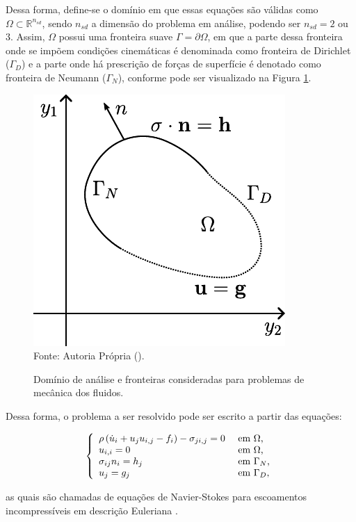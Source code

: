 \documentclass[_ArquivoPrincipal.tex]{subfiles}
\begin{document}
Dessa forma, define-se o domínio em que essas equações são válidas como $\Omega\subset\mathbb{R}^{n_{sd}}$, sendo $n_{sd}$ a dimensão do problema em análise, podendo ser $n_{sd}=2$ ou $3$. Assim, $\Omega$ possui uma fronteira suave $\Gamma=\partial\Omega$, em que a parte dessa fronteira onde se impõem condições cinemáticas é denominada como fronteira de Dirichlet ($\Gamma_D$) e a parte onde há prescrição de forças de superfície é denotado como fronteira de Neumann ($\Gamma_N$), conforme pode ser visualizado na Figura \ref{fig:Dom}.

\begin{figure}[h]
    \centering
    \caption{Domínio de análise e fronteiras consideradas para problemas de mecânica dos fluidos.}
    \includegraphics[width=.35\linewidth]{Figuras/Dom}
    \\Fonte: Autoria Própria (\the\year).
    \label{fig:Dom}
\end{figure}

Dessa forma, o problema a ser resolvido pode ser escrito a partir das equações:

\begin{equation}
    \left\{
    \begin{array}{ll}
        \rho\left({\dot{u}_i+u_ju_{i,j}-f_i}\right)-\sigma_{ji,j}=0 & \text{ em }\Omega\text{,}   \\
        u_{i,i}=0                                             & \text{ em }\Omega\text{,}   \\
        \sigma_{ij}n_i=h_j                                    & \text{ em }\Gamma_N\text{,} \\
        u_j=g_j                                               & \text{ em }\Gamma_D\text{,}
    \end{array}
    \right.\label{eq:NS-Euler}
\end{equation}

as quais são chamadas de equações de Navier-Stokes para escoamentos incompressíveis em descrição Euleriana \cite{bazilevs2013computational,bazilevs2010large,bazilevs2007variational,hughes2002variational,hughes2000large}.
\end{document}
